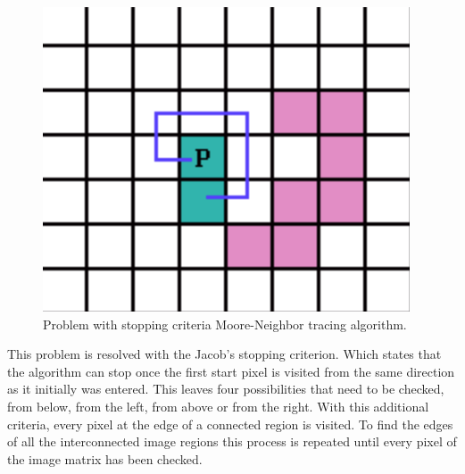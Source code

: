\documentclass{article}
\providecommand{\DIFdelbegin}{} %
\providecommand{\DIFdelend}{} %
\newcommand{\DIFscaledelfig}{0.5}
\newlength{\DIFdelgraphicswidth} %
\newlength{\DIFdelgraphicsheight} %
\newcommand{\DIFdelincludegraphics}[2][]{%
\sbox{\DIFdelgraphicsbox}{\DIFOincludegraphics[#1]{#2}}%
\settoboxwidth{\DIFdelgraphicswidth}{\DIFdelgraphicsbox} %
\settoboxtotalheight{\DIFdelgraphicsheight}{\DIFdelgraphicsbox} %
\scalebox{\DIFscaledelfig}{%
\parbox[b]{\DIFdelgraphicswidth}{\usebox{\DIFdelgraphicsbox}\\[-\baselineskip] \rule{\DIFdelgraphicswidth}{0em}}\llap{\resizebox{\DIFdelgraphicswidth}{\DIFdelgraphicsheight}{%
\setlength{\unitlength}{\DIFdelgraphicswidth}%
\begin{picture}(1,1)%
\thicklines\linethickness{2pt} %
{\color[rgb]{1,0,0}\put(0,0){\framebox(1,1){}}}%
{\color[rgb]{1,0,0}\put(0,0){\line( 1,1){1}}}%
{\color[rgb]{1,0,0}\put(0,1){\line(1,-1){1}}}%
\end{picture}%
}\hspace*{3pt}}} %
} %
\DeclareRobustCommand{\DIFdelbegin}{\DIFOdelbegin \let\includegraphics\DIFdelincludegraphics} %
\DeclareRobustCommand{\DIFdelend}{\DIFOaddend \let\includegraphics\DIFOincludegraphics} %
\begin{document}
\begin{figure}[h]
	\center
  \includegraphics[width=0.3\linewidth]{Moore_Neighbor.png}
  \caption{Problem with stopping criteria Moore-Neighbor tracing algorithm.\cite{Moore_Neighborhood}}
  \label{fig:Moore_Neighbor}
\end{figure}

\DIFdelbegin %
\DIFdelend This problem is resolved with the Jacob's stopping criterion. Which states that the algorithm can stop once the first start pixel is visited from the same direction as it initially was entered. This leaves four possibilities that need to be checked, from below, from the left, from above or from the right. With this additional criteria, every pixel at the edge of a connected region is visited. 
To find the edges of all the interconnected image regions this process is repeated until every pixel of the image matrix has been checked. 

\newpage
\nocite{*}


\newpage
\end{document}
